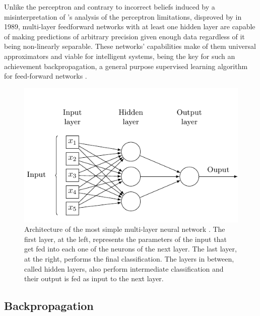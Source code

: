 Unlike the perceptron and contrary to incorrect beliefs induced by a misinterpretation of \citeauthor{Minsky1969}'s analysis of the perceptron limitations, disproved by \citet{Hornik1989} in 1989, multi-layer feedforward networks with at least one hidden layer are capable of making predictions of arbitrary precision given enough data regardless of it being non-linearly separable.
These networks' capabilities make of them universal approximators and viable for intelligent systems, being the key for such an achievement backpropagation, a general purpose supervised learning algorithm for feed-forward networks \cite{Rumelhart1986}.

\begin{figure}[t]
  \includegraphics[width=\textwidth]{tkz/mlffnn}
  \caption{
    Architecture of the most simple multi-layer neural network \cite{Medina2013A}.
    The first layer, at the left, represents the parameters of the input that get fed into each one of the neurons of the next layer.
    The last layer, at the right, performs the final classification.
    The layers in between, called hidden layers, also perform intermediate classification and their output is fed as input to the next layer.
  }
  \label{fig:sec:theory:mlffnn}
\end{figure}


\subsection{Backpropagation}
\label{sec:theory:mlffnn:backpropagation}

